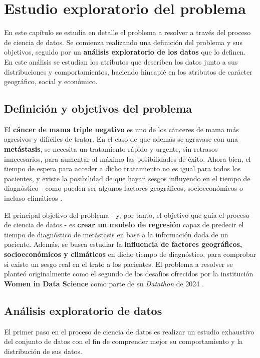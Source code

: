 \chapter{Estudio exploratorio del problema}

En este capítulo se estudia en detalle el problema a resolver a través del proceso de ciencia de datos. Se comienza realizando una definición del problema y sus objetivos, seguido por un \textbf{análisis exploratorio de los datos} que lo definen. En este análisis se estudian los atributos que describen los datos junto a sus distribuciones y comportamientos, haciendo hincapié en los atributos de carácter geográfico, social y económico.

\section{Definición y objetivos del problema}

El \textbf{cáncer de mama triple negativo} es uno de los cánceres de mama más agresivos y difíciles de tratar. En el caso de que además se agravase con una \textbf{metástasis}, se necesita un tratamiento rápido y urgente, sin retrasos innecesarios, para aumentar al máximo las posibilidades de éxito. Ahora bien, el tiempo de espera para acceder a dicho tratamiento no es igual para todos los pacientes, y existe la posibilidad de que hayan sesgos influyendo en el tiempo de diagnóstico - como pueden ser algunos factores geográficos, socioeconómicos o incluso climáticos \cite{widsdatathon2024-challenge2}.

El principal objetivo del problema - y, por tanto, el objetivo que guía el proceso de ciencia de datos - es \textbf{crear un modelo de regresión} capaz de predecir el tiempo de diagnóstico de metástasis en base a la información dada de un paciente. Además, se busca estudiar la \textbf{influencia de factores geográficos, socioeconómicos y climáticos} en dicho tiempo de diagnóstico, para comprobar si existe un sesgo real en el trato a los pacientes.
El problema a resolver se planteó originalmente como el segundo de los desafíos ofrecidos por la institución \textbf{Women in Data Science} como parte de su \textit{Datathon} de 2024 \cite{widsdatathon2024-challenge2}.

\section{Análisis exploratorio de datos}

El primer paso en el proceso de ciencia de datos es realizar un estudio exhaustivo del conjunto de datos con el fin de comprender mejor su comportamiento y la distribución de sus datos.

